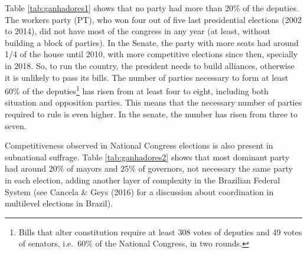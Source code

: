 \documentclass[
  12pt,
]{article}
\begin{document}
Table \ref{tab:ganhadores1} shows that no party had more than 20\% of
the deputies. The workers party (PT), who won four out of five last
presidential elections (2002 to 2014), did not have most of the congress
in any year (at least, without building a block of parties). In the
Senate, the party with more seats had around 1/4 of the house until
2010, with more competitive elections since then, specially in 2018. So,
to run the country, the president needs to build alliances, otherwise it
is unlikely to pass its bills. The number of parties necessary to form
at least 60\% of the deputies\footnote{Bills that alter constitution
  require at least 308 votes of deputies and 49 votes of senators,
  i.e.~60\% of the National Congress, in two rounds.} has risen from at
least four to eight, including both situation and opposition parties.
This means that the necessary number of parties required to rule is even
higher. In the senate, the number has risen from three to seven.

Competitiveness observed in National Congress elections is also present
in subnational suffrage. Table \ref{tab:ganhadores2} shows that most
dominant party had around 20\% of mayors and 25\% of governors, not
necessary the same party in each election, adding another layer of
complexity in the Brazilian Federal System (see Cancela \& Geys (2016)
for a discussion about coordination in multilevel elections in Brazil).
\end{document}
